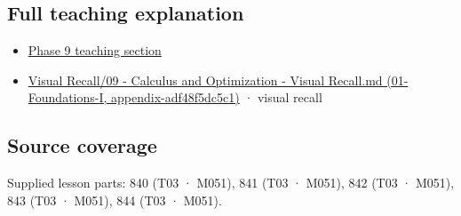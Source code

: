 \subsection{Full teaching explanation}\label{appendix-8f96f9c4d5bc-full-teaching-explanation}

\begin{itemize}
\tightlist
\item
  \hyperref[02-foundations-ii-ch025-odes-and-numerical-simulation]{Phase 9 teaching section}
\item
  \href{../01-Foundations-I/main.pdf\#nameddest=appendix-adf48f5dc5c1}{Visual Recall/09 - Calculus and Optimization - Visual Recall.md (01-Foundations-I, appendix-adf48f5dc5c1)} · visual recall
\end{itemize}

\subsection{Source coverage}\label{appendix-8f96f9c4d5bc-source-coverage}

Supplied lesson parts: 840 (T03 · M051), 841 (T03 · M051), 842 (T03 · M051), 843 (T03 · M051), 844 (T03 · M051).
